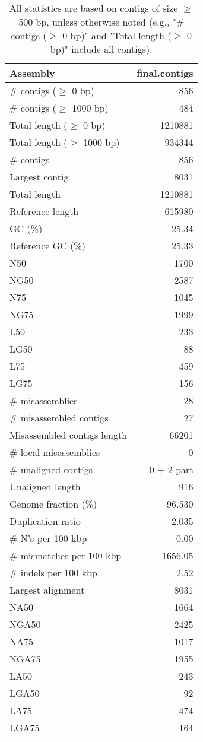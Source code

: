 \documentclass[12pt,a4paper]{article}
\begin{document}
\begin{table}[ht]
\begin{center}
\caption{All statistics are based on contigs of size $\geq$ 500 bp, unless otherwise noted (e.g., "\# contigs ($\geq$ 0 bp)" and "Total length ($\geq$ 0 bp)" include all contigs).}
\begin{tabular}{|l*{1}{|r}|}
\hline
Assembly & final.contigs \\ \hline
\# contigs ($\geq$ 0 bp) & 856 \\ \hline
\# contigs ($\geq$ 1000 bp) & 484 \\ \hline
Total length ($\geq$ 0 bp) & 1210881 \\ \hline
Total length ($\geq$ 1000 bp) & 934344 \\ \hline
\# contigs & 856 \\ \hline
Largest contig & 8031 \\ \hline
Total length & 1210881 \\ \hline
Reference length & 615980 \\ \hline
GC (\%) & 25.34 \\ \hline
Reference GC (\%) & 25.33 \\ \hline
N50 & 1700 \\ \hline
NG50 & 2587 \\ \hline
N75 & 1045 \\ \hline
NG75 & 1999 \\ \hline
L50 & 233 \\ \hline
LG50 & 88 \\ \hline
L75 & 459 \\ \hline
LG75 & 156 \\ \hline
\# misassemblies & 28 \\ \hline
\# misassembled contigs & 27 \\ \hline
Misassembled contigs length & 66201 \\ \hline
\# local misassemblies & 0 \\ \hline
\# unaligned contigs & 0 + 2 part \\ \hline
Unaligned length & 916 \\ \hline
Genome fraction (\%) & 96.530 \\ \hline
Duplication ratio & 2.035 \\ \hline
\# N's per 100 kbp & 0.00 \\ \hline
\# mismatches per 100 kbp & 1656.05 \\ \hline
\# indels per 100 kbp & 2.52 \\ \hline
Largest alignment & 8031 \\ \hline
NA50 & 1664 \\ \hline
NGA50 & 2425 \\ \hline
NA75 & 1017 \\ \hline
NGA75 & 1955 \\ \hline
LA50 & 243 \\ \hline
LGA50 & 92 \\ \hline
LA75 & 474 \\ \hline
LGA75 & 164 \\ \hline
\end{tabular}
\end{center}
\end{table}
\end{document}
